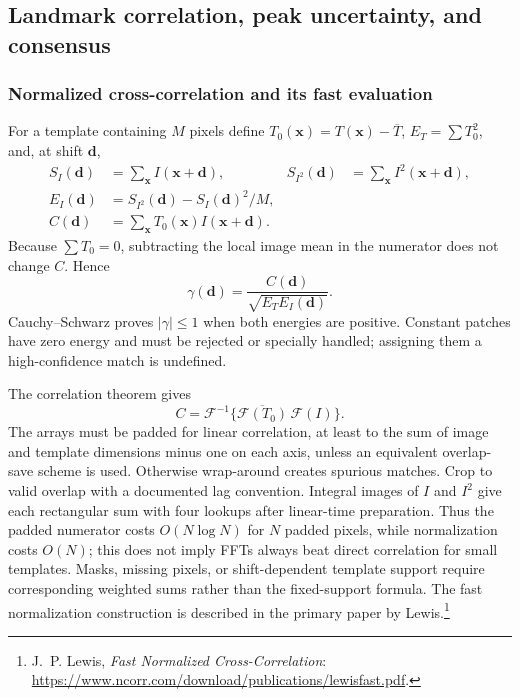 \documentclass[11pt,a4paper]{article}
\numberwithin{equation}{section}
\begin{document}
\subsection{Landmark correlation, peak uncertainty, and consensus}

\subsubsection{Normalized cross-correlation and its fast evaluation}

For a template containing $M$ pixels define
$T_0(\boldsymbol x)=T(\boldsymbol x)-\overline T$,
$E_T=\sum T_0^2$, and, at shift $\boldsymbol d$,
\begin{align}
 S_I(\boldsymbol d)&=\sum_{\boldsymbol x}I(\boldsymbol x+\boldsymbol d),
 &S_{I^2}(\boldsymbol d)&=\sum_{\boldsymbol x}I^2(\boldsymbol x+\boldsymbol d),\\
 E_I(\boldsymbol d)&=S_{I^2}(\boldsymbol d)-S_I(\boldsymbol d)^2/M,\\
 C(\boldsymbol d)&=\sum_{\boldsymbol x}T_0(\boldsymbol x)
                                      I(\boldsymbol x+\boldsymbol d).
\end{align}
Because $\sum T_0=0$, subtracting the local image mean in the numerator
does not change $C$. Hence
\begin{equation}
 \gamma(\boldsymbol d)=\frac{C(\boldsymbol d)}{
                         \sqrt{E_T E_I(\boldsymbol d)}}.
 \label{eq:ncc-fast}
\end{equation}
Cauchy--Schwarz proves $|\gamma|\leq1$ when both energies are positive.
Constant patches have zero energy and must be rejected or specially
handled; assigning them a high-confidence match is undefined.

The correlation theorem gives
\begin{equation}
 C=\mathcal F^{-1}\{\overline{\mathcal F(T_0)}\,\mathcal F(I)\}.
\end{equation}
The arrays must be padded for linear correlation, at least to the sum
of image and template dimensions minus one on each axis, unless an
equivalent overlap-save scheme is used. Otherwise wrap-around creates
spurious matches. Crop to valid overlap with a documented lag convention.
Integral images of $I$ and $I^2$ give each rectangular sum with four
lookups after linear-time preparation. Thus the padded numerator costs
$O(N\log N)$ for $N$ padded pixels, while normalization costs $O(N)$;
this does not imply FFTs always beat direct correlation for small
templates. Masks, missing pixels, or shift-dependent template support
require corresponding weighted sums rather than the fixed-support
formula. The fast normalization construction is described in the primary
paper by Lewis.\footnote{J.~P. Lewis, \emph{Fast Normalized
Cross-Correlation}: \url{https://www.ncorr.com/download/publications/lewisfast.pdf}.}
\end{document}
